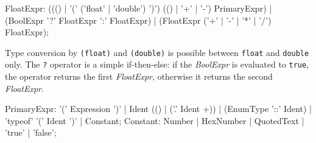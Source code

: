 \begin{rail}  
  FloatExpr: ((() | '(' ('float' | 'double') ')') (() | '+' | '-') PrimaryExpr) | (BoolExpr '?' FloatExpr ':' FloatExpr) | (FloatExpr ('+' | '-' | '*' | '/') FloatExpr);
\end{rail} 
Type conversion by \texttt{(float)} and \texttt{(double)} is possible between \texttt{float} and \texttt{double} only. The \texttt{?} operator is a simple if-then-else: if the \emph{BoolExpr} is evaluated to \texttt{true}, the operator returns the first \emph{FloatExpr}, otherwise it returns the second \emph{FloatExpr}.

\begin{rail} 
  PrimaryExpr: '(' Expression ')' | Ident (() | ('.' Ident +)) | (EnumType '::' Ident) | 'typeof' '(' Ident ')' | Constant;
  Constant: Number | HexNumber | QuotedText | 'true' | 'false';
\end{rail}
